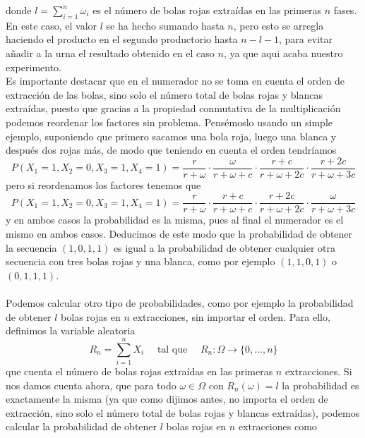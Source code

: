 \begin{ejemplo}
\begin{equation*}
    \end{equation*}
    donde $l=\sum\limits_{i=1}^n \omega_i$ es el número de bolas rojas extraídas en las primeras $n$ fases. En este caso, el valor $l$ se ha hecho sumando hasta $n$, pero esto se arregla haciendo el producto en el segundo productorio hasta $n-l-1$, para evitar añadir a la urna el resultado obtenido en el caso $n$, ya que aqui acaba nuestro experimento. \\
    \noindent
    Es importante destacar que en el numerador no se toma en cuenta el orden de extracción de las bolas, sino solo el número total de bolas rojas y blancas extraídas, puesto que gracias a la propiedad conmutativa de la multiplicación podemos reordenar los factores sin problema. Pensémoslo usando un simple ejemplo, suponiendo que primero sacamos una bola roja, luego una blanca y después dos rojas más, de modo que teniendo en cuenta el orden tendríamos
    \begin{equation*}
        P(X_1=1, X_2=0, X_3=1, X_4=1) = \dfrac{r}{r+\omega} \cdot \dfrac{\omega}{r+\omega+c} \cdot \dfrac{r+c}{r+\omega+2c} \cdot \dfrac{r+2c}{r+\omega+3c}
    \end{equation*}
    pero si reordenamos los factores tenemos que
    \begin{equation*}
        P(X_1=1, X_2=0, X_3=1, X_4=1) = \dfrac{r}{r+\omega} \cdot \dfrac{r+c}{r+\omega+c} \cdot \dfrac{r+2c}{r+\omega+2c} \cdot \dfrac{\omega}{r+\omega+3c}
    \end{equation*}
    y en ambos casos la probabilidad es la misma, pues al final el numerador es el mismo en ambos casos. Deducimos de este modo que la probabilidad de obtener la secuencia $(1,0,1,1)$ es igual a la probabilidad de obtener cualquier otra secuencia con tres bolas rojas y una blanca, como por ejemplo $(1,1,0,1)$ o $(0,1,1,1)$. \\ \\
    Podemos calcular otro tipo de probabilidades, como por ejemplo la probabilidad de obtener $l$ bolas rojas en $n$ extracciones, sin importar el orden. Para ello, definimos la variable aleatoria 
    $$R_n=\sum\limits_{i=1}^n X_i \quad \text{ tal que } \quad R_n: \Omega \to \{0, \ldots, n\}$$
    que cuenta el número de bolas rojas extraídas en las primeras $n$ extracciones. Si nos damos cuenta ahora, que para todo $\omega\in \Omega$ con $R_n(\omega)=l$ la probabilidad es exactamente la misma (ya que como dijimos antes, no importa el orden de extracción, sino solo el número total de bolas rojas y blancas extraídas), podemos calcular la probabilidad de obtener $l$ bolas rojas en $n$ extracciones como

\end{ejemplo}
